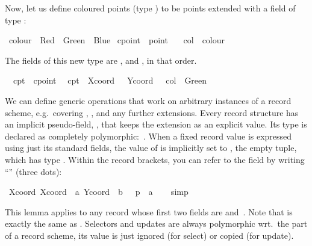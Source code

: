 \begin{isabellebody}
\begin{isamarkuptext}
  Now, let us define coloured points (type ) to be
  points extended with a field  of type :%
\end{isamarkuptext}%
\isamarkuptrue%
\ colour\ {\isacharequal}\ Red\ {\isacharbar}\ Green\ {\isacharbar}\ Blue\isanewline
\isanewline
\isamarkupfalse%
\ cpoint\ {\isacharequal}\ point\ {\isacharplus}\isanewline
\ \ col\ {\isacharcolon}{\isacharcolon}\ colour\isamarkupfalse%
%
\begin{isamarkuptext}%
The fields of this new type are ,  and
  , in that order.%
\end{isamarkuptext}%
\isamarkuptrue%
\isanewline
\ \ cpt{}\ {\isacharcolon}{\isacharcolon}\ cpoint\isanewline
\ \ {\isachardoublequote}cpt{}\ {\isasymequiv}\ {\isasymlparr}Xcoord\ {\isacharequal}\ {}{}{}{\isacharcomma}\ Ycoord\ {\isacharequal}\ {}{}{\isacharcomma}\ col\ {\isacharequal}\ Green{\isasymrparr}{\isachardoublequote}\isamarkupfalse%
%
\begin{isamarkuptext}%
\medskip We can define generic operations that work on arbitrary
  instances of a record scheme, e.g.\ covering , , and any further extensions.  Every record structure has an
  implicit pseudo-field, , that keeps the extension as an
  explicit value.  Its type is declared as completely
  polymorphic:~.  When a fixed record value is expressed
  using just its standard fields, the value of  is
  implicitly set to \isa{{\isacharparenleft}{\isacharparenright}}, the empty tuple, which has type
  .  Within the record brackets, you can refer to the
   field by writing ``\isa{{\isasymdots}}'' (three dots):%
\end{isamarkuptext}%
\isamarkuptrue%
\ {\isachardoublequote}Xcoord\ {\isasymlparr}Xcoord\ {\isacharequal}\ a{\isacharcomma}\ Ycoord\ {\isacharequal}\ b{\isacharcomma}\ {\isasymdots}\ {\isacharequal}\ p{\isasymrparr}\ {\isacharequal}\ a{\isachardoublequote}\isanewline
\ \ \isamarkupfalse%
\ simp\isamarkupfalse%
%
\begin{isamarkuptext}%
This lemma applies to any record whose first two fields are  and~.  Note that  is exactly the same as .  Selectors and updates are always polymorphic wrt.\ the
   part of a record scheme, its value is just ignored (for
  select) or copied (for update).


\end{isamarkuptext}
\end{isabellebody}
